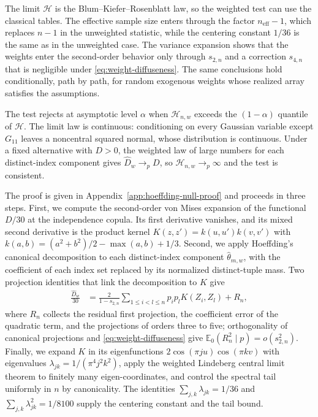 The limit $\mathcal H$ is the Blum--Kiefer--Rosenblatt law, so the weighted
test can use the classical tables. The effective sample size enters through
the factor $n_{\mathrm{eff}}-1$, which replaces $n-1$ in the unweighted
statistic, while the centering constant $1/36$ is the same as in the
unweighted case. The variance expansion shows that the weights enter the
second-order behavior only through $s_{2,n}$ and a correction $s_{4,n}$ that
is negligible under \eqref{eq:weight-diffuseness}. The same conclusions hold
conditionally, path by path, for random exogenous weights whose realized array
satisfies the assumptions.

The test rejects at asymptotic level $\alpha$ when $\mathcal H_{n,w}$ exceeds
the $(1-\alpha)$ quantile of $\mathcal H$. The limit law is continuous:
conditioning on every Gaussian variable except $G_{11}$ leaves a noncentral
squared normal, whose distribution is continuous. Under a fixed alternative
with $D>0$, the weighted law of large numbers for each distinct-index
component gives $\widehat D_w\to_p D$, so $\mathcal H_{n,w}\to_p\infty$ and
the test is consistent.

The proof is given in Appendix~\ref{app:hoeffding-null-proof} and proceeds in
three steps. First, we compute the second-order von Mises expansion of the
functional $D/30$ at the independence copula. Its first derivative vanishes,
and its mixed second derivative is the product kernel
$K(z,z')=k(u,u')k(v,v')$ with $k(a,b)=(a^2+b^2)/2-\max(a,b)+1/3$. Second, we
apply Hoeffding's canonical decomposition to each distinct-index component
$\widehat\theta_{m,w}$, with the coefficient of each index set replaced by
its normalized distinct-tuple mass. Two projection identities that link the
decomposition to $K$ give
\begin{align*}
  \frac{\widehat D_w}{30}
  &= \frac{2}{1-s_{2,n}}
     \sum_{1\leq i<l\leq n}p_ip_lK(Z_i,Z_l)+R_n,
\end{align*}
where $R_n$ collects the residual first projection, the coefficient error of
the quadratic term, and the projections of orders three to five;
orthogonality of canonical projections and \eqref{eq:weight-diffuseness} give
$\mathbb{E}_0(R_n^2\mid p)=o(s_{2,n}^2)$. Finally, we expand $K$ in its
eigenfunctions $2\cos(\pi ju)\cos(\pi kv)$ with eigenvalues
$\lambda_{jk}=1/(\pi^4j^2k^2)$, apply the weighted Lindeberg central limit
theorem to finitely many eigen-coordinates, and control the spectral tail
uniformly in $n$ by canonicality. The identities
$\sum_{j,k}\lambda_{jk}=1/36$ and $\sum_{j,k}\lambda_{jk}^2=1/8100$ supply
the centering constant and the tail bound.

